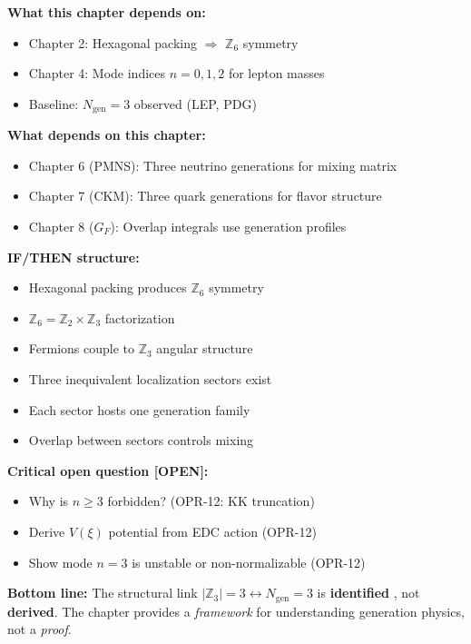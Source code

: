 \begin{tcolorbox}[colback=gray!5!white, colframe=gray!60!black,
    title=\textbf{Dependency Map \& Status (IF/THEN)}]
\textbf{What this chapter depends on:}
\begin{itemize}[nosep]
    \item Chapter 2: Hexagonal packing $\Rightarrow$ $\mathbb{Z}_6$ symmetry \tagDc{}
    \item Chapter 4: Mode indices $n = 0, 1, 2$ for lepton masses \tagI{}
    \item Baseline: $N_{\text{gen}} = 3$ observed (LEP, PDG) \tagBL{}
\end{itemize}

\textbf{What depends on this chapter:}
\begin{itemize}[nosep]
    \item Chapter 6 (PMNS): Three neutrino generations for mixing matrix
    \item Chapter 7 (CKM): Three quark generations for flavor structure
    \item Chapter 8 ($G_F$): Overlap integrals use generation profiles
\end{itemize}

\textbf{IF/THEN structure:}
\begin{itemize}[nosep]
    \item[\textbf{IF}] Hexagonal packing produces $\mathbb{Z}_6$ symmetry \tagDc{}
    \item[\textbf{AND}] $\mathbb{Z}_6 = \mathbb{Z}_2 \times \mathbb{Z}_3$ factorization \tagM{}
    \item[\textbf{AND}] Fermions couple to $\mathbb{Z}_3$ angular structure \tagP{}
    \item[\textbf{THEN}] Three inequivalent localization sectors exist \tagI{}
    \item[\textbf{AND}] Each sector hosts one generation family \tagI{}
    \item[\textbf{AND}] Overlap between sectors controls mixing \tagI{}
\end{itemize}

\textbf{Critical open question [OPEN]:}
\begin{itemize}[nosep]
    \item[$\circ$] Why is $n \geq 3$ forbidden? (OPR-12: KK truncation)
    \item[$\circ$] Derive $V(\xi)$ potential from EDC action (OPR-12)
    \item[$\circ$] Show mode $n = 3$ is unstable or non-normalizable (OPR-12)
\end{itemize}

\textbf{Bottom line:}
The structural link $|\mathbb{Z}_3| = 3 \leftrightarrow N_{\text{gen}} = 3$ is
\textbf{identified} \tagI{}, not \textbf{derived}. The chapter provides a
\emph{framework} for understanding generation physics, not a \emph{proof}.
\end{tcolorbox}

